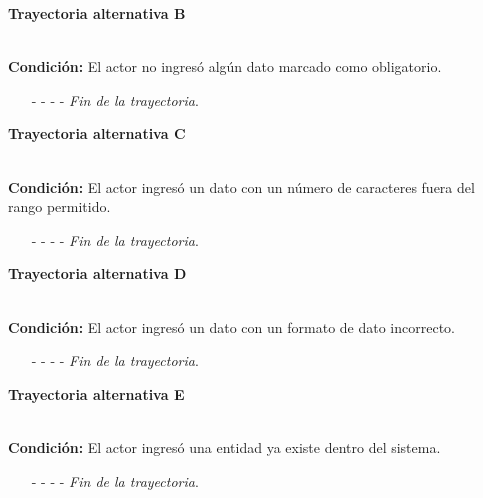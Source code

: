 \hypertarget{CU7-2:TAB}{\textbf{Trayectoria alternativa B}}\\
\noindent \textbf{Condición:} El actor no ingresó algún dato marcado como obligatorio.
\begin{enumerate}
	\UCpaso[\UCsist] Muestra el mensaje  señalando el campo que presenta el error en la pantalla .
	\UCpaso Regresa al paso \ref{CU7.2-P5} de la trayectoria principal.
	\item[- -] - - {\em {Fin de la trayectoria}}.%
\end{enumerate}
\hypertarget{CU7-2:TAC}{\textbf{Trayectoria alternativa C}}\\
\noindent \textbf{Condición:} El actor ingresó un dato con un número de caracteres fuera del rango permitido.
\begin{enumerate}
	\UCpaso[\UCsist] Muestra el mensaje  señalando el campo que presenta el error en la pantalla .
	\UCpaso Regresa al paso \ref{CU7.2-P5} de la trayectoria principal.
	\item[- -] - - {\em {Fin de la trayectoria}}.%
\end{enumerate}
\hypertarget{CU7-2:TAD}{\textbf{Trayectoria alternativa D}}\\
\noindent \textbf{Condición:} El actor ingresó un dato con un formato de dato incorrecto.
\begin{enumerate}
	\UCpaso[\UCsist] Muestra el mensaje  señalando el campo que presenta el error en la pantalla .
	\UCpaso Regresa al paso \ref{CU7.2-P5} de la trayectoria principal.
	\item[- -] - - {\em {Fin de la trayectoria}}.
\end{enumerate}
\hypertarget{CU7-2:TAE}{\textbf{Trayectoria alternativa E}}\\
\noindent \textbf{Condición:} El actor ingresó una entidad ya existe dentro del sistema.
\begin{enumerate}
	\UCpaso[\UCsist] Muestra el mensaje  señalando el campo que presenta la duplicidad en la pantalla .
	\UCpaso Regresa al paso \ref{CU7.2-P5} de la trayectoria principal.
	\item[- -] - - {\em {Fin de la trayectoria}}.
\end{enumerate}
